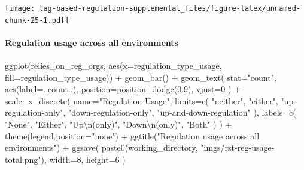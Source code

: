 \documentclass[
]{book}
\newenvironment{Shaded}{\begin{snugshade}}{\end{snugshade}}
\newcommand{\AttributeTok}[1]{\textcolor[rgb]{0.77,0.63,0.00}{#1}}
\newcommand{\DecValTok}[1]{\textcolor[rgb]{0.00,0.00,0.81}{#1}}
\newcommand{\FloatTok}[1]{\textcolor[rgb]{0.00,0.00,0.81}{#1}}
\newcommand{\FunctionTok}[1]{\textcolor[rgb]{0.00,0.00,0.00}{#1}}
\newcommand{\NormalTok}[1]{#1}
\newcommand{\SpecialCharTok}[1]{\textcolor[rgb]{0.00,0.00,0.00}{#1}}
\newcommand{\StringTok}[1]{\textcolor[rgb]{0.31,0.60,0.02}{#1}}
\begin{document}
\texttt{[image: tag-based-regulation-supplemental\_files/figure-latex/unnamed-chunk-25-1.pdf]}

\hypertarget{regulation-usage-across-all-environments}{%
\paragraph{Regulation usage across all environments}\label{regulation-usage-across-all-environments}}

\begin{Shaded}
\begin{Highlighting}[]
\FunctionTok{ggplot}\NormalTok{(relies\_on\_reg\_orgs, }\FunctionTok{aes}\NormalTok{(}\AttributeTok{x=}\NormalTok{regulation\_type\_usage, }\AttributeTok{fill=}\NormalTok{regulation\_type\_usage)) }\SpecialCharTok{+}
  \FunctionTok{geom\_bar}\NormalTok{() }\SpecialCharTok{+}
  \FunctionTok{geom\_text}\NormalTok{(}
    \AttributeTok{stat=}\StringTok{"count"}\NormalTok{,}
    \FunctionTok{aes}\NormalTok{(}\AttributeTok{label=}\NormalTok{..count..),}
    \AttributeTok{position=}\FunctionTok{position\_dodge}\NormalTok{(}\FloatTok{0.9}\NormalTok{),}
    \AttributeTok{vjust=}\DecValTok{0}
\NormalTok{  ) }\SpecialCharTok{+}
  \FunctionTok{scale\_x\_discrete}\NormalTok{(}
    \AttributeTok{name=}\StringTok{"Regulation Usage"}\NormalTok{,}
    \AttributeTok{limits=}\FunctionTok{c}\NormalTok{(}
      \StringTok{"neither"}\NormalTok{,}
      \StringTok{"either"}\NormalTok{,}
      \StringTok{"up{-}regulation{-}only"}\NormalTok{,}
      \StringTok{"down{-}regulation{-}only"}\NormalTok{,}
      \StringTok{"up{-}and{-}down{-}regulation"}
\NormalTok{    ),}
    \AttributeTok{labels=}\FunctionTok{c}\NormalTok{(}
      \StringTok{"None"}\NormalTok{,}
      \StringTok{"Either"}\NormalTok{,}
      \StringTok{"Up}\SpecialCharTok{\textbackslash{}n}\StringTok{(only)"}\NormalTok{,}
      \StringTok{"Down}\SpecialCharTok{\textbackslash{}n}\StringTok{(only)"}\NormalTok{,}
      \StringTok{"Both"}
\NormalTok{    )}
\NormalTok{  ) }\SpecialCharTok{+}
  \FunctionTok{theme}\NormalTok{(}\AttributeTok{legend.position=}\StringTok{"none"}\NormalTok{) }\SpecialCharTok{+}
  \FunctionTok{ggtitle}\NormalTok{(}\StringTok{"Regulation usage across all environments"}\NormalTok{) }\SpecialCharTok{+}
  \FunctionTok{ggsave}\NormalTok{(}
    \FunctionTok{paste0}\NormalTok{(working\_directory, }\StringTok{"imgs/rst{-}reg{-}usage{-}total.png"}\NormalTok{),}
    \AttributeTok{width=}\DecValTok{8}\NormalTok{,}
    \AttributeTok{height=}\DecValTok{6}
\NormalTok{  )}
\end{Highlighting}
\end{Shaded}
\end{document}
